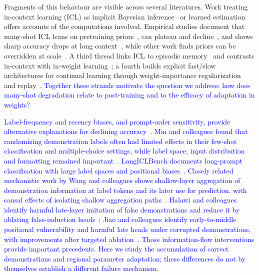 \documentclass[pdflatex, sn-nature]{sn-jnl}%
\theoremstyle{thmstyleone}%
\theoremstyle{thmstyletwo}%
\theoremstyle{thmstylethree}%
\begin{document}
Fragments of this behaviour are visible across several literatures. Work treating
in-context learning (ICL) as implicit Bayesian inference~\cite{xie2022bayesian} or
learned estimation~\cite{garg2022transformers,akyurek2023icl} offers accounts of the
computations involved. Empirical studies document that many-shot ICL leans on
pretraining priors~\cite{pan2023whaticllearns,wei2023largericldifferently}, can plateau
and decline~\cite{tang2025overprompting,zhang2025moreisnotbetter}, and shows sharp
accuracy drops at long context~\cite{zou2025manyiclbench}, while other work finds
priors can be overridden at scale~\cite{agarwal2024manyshot,bertsch2025longicl}. A
third thread links ICL to episodic memory~\cite{jian2024icl} and contrasts in-context
with in-weight learning~\cite{russin2025iclinweight,lampinen2025latent,xu2026memo,tiwari2026fastslow};
a fourth builds explicit fast/slow architectures for continual learning through
weight-importance regularization~\cite{kirkpatrick2017ewc,zenke2017si} and
replay~\cite{lopezpaz2017gem,shin2017dgr,vandeven2020brainreplay,arani2022clser,pham2021dualnet}\textcolor{blue}{.
Together these strands motivate the question we address: how does many-shot
degradation relate to post-training and to the efficacy of adaptation in weights?}

\textcolor{blue}{Label-frequency and recency biases, and prompt-order sensitivity, provide alternative
explanations for declining accuracy}~\textcolor{blue}{\cite{zhao2021calibrate,lu2022orderedprompts}}\textcolor{blue}{. Min
and colleagues found that randomizing demonstration labels often had limited effects
in their few-shot classification and multiple-choice settings, while label space,
input distribution and formatting remained important}~\textcolor{blue}{\cite{min2022demonstrations}}\textcolor{blue}{.
LongICLBench documents long-prompt classification with large label spaces and
positional biases}~\textcolor{blue}{\cite{li2025longiclbench}}\textcolor{blue}{. Closely related mechanistic work by Wang
and colleagues shows shallow-layer aggregation of demonstration information at label
tokens and its later use for prediction, with causal effects of isolating shallow
aggregation paths}~\textcolor{blue}{\cite{wang2023labelanchors}}\textcolor{blue}{. Halawi and colleagues identify harmful
late-layer imitation of false demonstrations and reduce it by ablating
false-induction heads}~\textcolor{blue}{\cite{halawi2024overthinking}}\textcolor{blue}{; Jiao and colleagues identify
early-to-middle positional vulnerability and harmful late heads under corrupted
demonstrations, with improvements after targeted ablation}~\textcolor{blue}{\cite{jiao2026logitlens}}\textcolor{blue}{. Those information-flow interventions provide
important precedents. Here we study the accumulation of correct demonstrations and
regional parameter adaptation; these differences do not by themselves establish a
different failure mechanism.}
\end{document}
